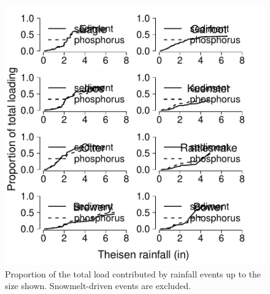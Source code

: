 \documentclass[10pt]{article}
\begin{document}
\begin{figure}
    \begin{center}
\includegraphics{loadings-figure2}
    \end{center}
    \caption{Proportion of the total load contributed by rainfall events up to the size shown. Snowmelt-driven events are excluded.\label{cdf}}
\end{figure}
\end{document}
